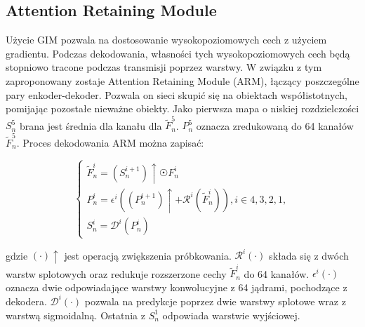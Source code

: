 \documentclass[a4paper,12pt,twoside,openany]{report}
\begin{document}
\subsection{Attention Retaining Module}

Użycie GIM pozwala na dostosowanie wysokopoziomowych cech z użyciem gradientu. Podczas dekodowania, własności tych wysokopoziomowych cech będą stopniowo tracone podczas transmisji poprzez warstwy. W związku z tym zaproponowany zostaje Attention Retaining Module (ARM), łączący poszczególne pary enkoder-dekoder. Pozwala on sieci skupić się na obiektach współistotnych, pomijając pozostałe nieważne obiekty. Jako pierwsza mapa o niskiej rozdzielczości $S_n^5$ brana jest średnia dla kanału dla $\tilde F_n^5$. $P_n^5$ oznacza zredukowaną do 64 kanałów $\tilde F_n^5$. Proces dekodowania ARM można zapisać:

$$
\begin{cases}
	\tilde F_n^i = (S_n^{i+1}) \uparrow \astrosun F_n^i \\
	P_n^i = \epsilon^i \left(\left(P_n^{i+1}\right)\uparrow+\mathcal{R}^i\left(\tilde F_n^i\right)\right), i \in {4, 3, 2, 1}, \\
	S_n^i = \mathcal{D}^i (P^i_n)
\end{cases}
$$

gdzie $(\cdot)\uparrow$ jest operacją zwiększenia próbkowania. $\mathcal{R}^i\left(\cdot\right)$ składa się z dwóch warstw splotowych oraz redukuje rozszerzone cechy $\tilde F_n^i$ do 64 kanałów. $\epsilon^i(\cdot)$ oznacza dwie odpowiadające warstwy konwolucyjne z 64 jądrami, pochodzące z dekodera. $\mathcal{D}^i(\cdot)$ pozwala na predykcje poprzez dwie warstwy splotowe wraz z warstwą sigmoidalną. Ostatnia z $S^1_n$ odpowiada warstwie wyjściowej.
\end{document}
